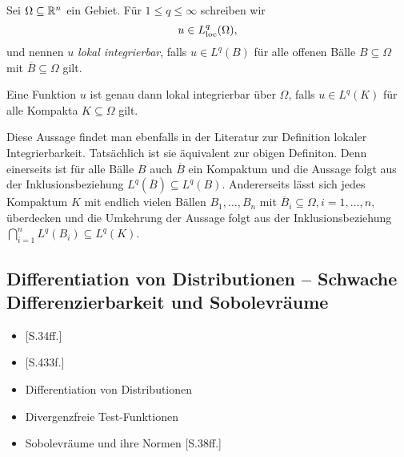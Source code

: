 Sei $\Omega \subseteq \mathbb{R}^n$ ein Gebiet. Für $1 \leq q \leq \infty$ schreiben wir
$$
  u \in L^q_{\operatorname{loc}}(\Omega),
$$
und nennen $u$ \emph{lokal integrierbar}, falls $u \in L^q(B)$ für alle offenen Bälle $B \subseteq \Omega$ mit $\overline B \subseteq \Omega$ gilt.


\begin{bem}
  Eine Funktion $u$ ist genau dann lokal integrierbar über $\Omega$, falls $u \in L^q(K)$ für alle Kompakta $K \subseteq \Omega$ gilt.

  Diese Aussage findet man ebenfalls in der Literatur zur Definition lokaler Integrierbarkeit.
  Tatsächlich ist sie äquivalent zur obigen Definiton.
  Denn einerseits ist für alle Bälle $B$ auch $\overline B$ ein Kompaktum und die Aussage folgt aus der Inklusionsbeziehung $L^q(\overline B) \subseteq L^q(B)$.
  Andererseits lässt sich jedes Kompaktum $K$ mit endlich vielen Bällen $B_1, \dots, B_n$ mit $\overline B_i \subseteq \Omega, i =1,\dots,n,$ überdecken und die Umkehrung der Aussage folgt aus der Inklusionsbeziehung $\bigcap_{i = 1}^n L^q(B_i) \subseteq L^q(K)$.
\end{bem}

\subsection{Differentiation von Distributionen -- Schwache Differenzierbarkeit und Sobolevräume}

\begin{itemize}
  \item \cite{sohr2001navier}[S.34ff.]
  \item \cite{werner2011fa}[S.433f.]
  \item Differentiation von Distributionen
  \item Divergenzfreie Test-Funktionen
  \item Sobolevräume und ihre Normen \cite{sohr2001navier}[S.38ff.]
\end{itemize}

